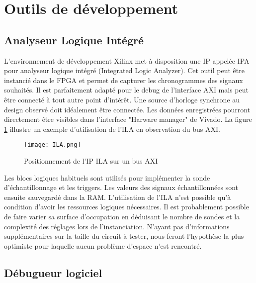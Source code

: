 \section{Outils de développement}

\subsection{Analyseur Logique Intégré}
L'environnement de développement Xilinx met à disposition une IP appelée IPA pour analyseur logique intégré (Integrated Logic Analyzer).
Cet outil peut être instancié dans le FPGA et permet de capturer les chronogrammes des signaux souhaités.
Il est parfaitement adapté pour le debug de l'interface AXI mais peut être connecté à tout autre point d'intérêt.
Une source d'horloge synchrone au design observé doit idéalement être connectée. \cite{ILA_doc}
Les données enregistrées pourront directement être visibles dans l'interface "Harware manager" de Vivado.
La figure \ref{fig:ILA} illustre un exemple d'utilisation de l'ILA en observation du bus AXI.
\begin{figure}[H]
    \centering
    \texttt{[image: ILA.png]}
    \caption{Positionnement de l'IP ILA sur un bus AXI}
    \label{fig:ILA}
\end{figure}
Les blocs logiques habituels sont utilisés pour implémenter la sonde d'échantillonnage et les triggers.
Les valeurs des signaux échantillonnées sont ensuite sauvegardé dans la RAM.
L'utilisation de l'ILA n'est possible qu'à condition d'avoir les ressources logiques nécessaires.
Il est probablement possible de faire varier sa surface d'occupation en déduisant le nombre de sondes et la complexité des réglages lors de l'instanciation.
N'ayant pas d'informations supplémentaires sur la taille du circuit à tester, nous feront l'hypothèse la plus optimiste pour laquelle aucun problème d'espace n'est rencontré.

\subsection{Débugueur logiciel}
